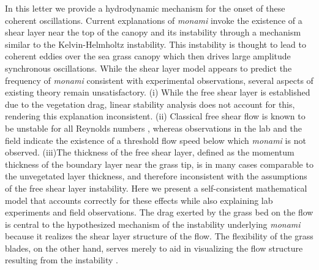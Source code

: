 \documentclass[aps,prl,twocolumn,superscriptaddress,10pt]{revtex4-1}  %
\newcommand{\monami}{\textit{monami }}
\begin{document}
In this letter we provide a hydrodynamic mechanism for the onset of these coherent oscillations.
\newline
Current explanations of \monami invoke the existence of a shear layer near the top of the canopy  \cite{Ghisal02,Raupach96} and its instability through a mechanism similar to the Kelvin-Helmholtz instability. 
This instability is thought to lead to coherent eddies over the sea grass canopy which then drives large amplitude synchronous oscillations.
\newline
While the shear layer model appears to predict the frequency of \monami consistent with experimental observations, several aspects of existing theory remain unsatisfactory. 
(i) While the free shear layer is established due to the vegetation drag, linear stability analysis \cite{Raupach96} does not account for this, rendering this explanation inconsistent. 
(ii) Classical free shear flow is known to be unstable for all Reynolds numbers \cite{drazin}, whereas observations in the lab \cite{Ghisal02} and the field \cite{Grizzle96} indicate the existence of a threshold 
flow speed below which \monami is not observed. 
(iii)The thickness of the free shear layer, defined as the momentum thickness of the boundary layer near the grass tip, is in many cases comparable to the unvegetated layer thickness,
and therefore inconsistent with the assumptions of the free shear layer instability.
Here we present a self-consistent mathematical model that accounts correctly for these effects 
while also explaining lab experiments and field observations.
\newline
The drag exerted by the grass bed on the flow is central to the hypothesized mechanism \cite{Ghisal02} of the instability underlying \monami because it realizes the shear layer structure of the flow. 
The flexibility of the grass blades, on the other hand, serves merely to aid in visualizing the flow structure resulting from the instability \cite{Nepf2012}. 
\end{document}

